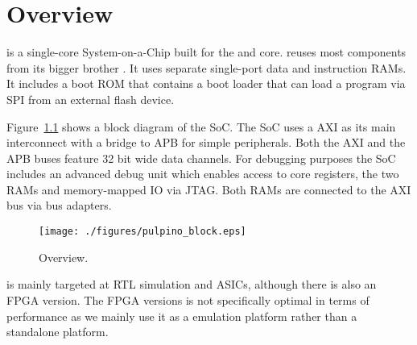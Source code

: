 \chapter{Overview}

\pulpino is a single-core System-on-a-Chip built for the \riscv \rvcore and \zerocore core.
\pulpino reuses most components from its bigger brother \pulp.
It uses separate single-port data and instruction RAMs. It includes a boot ROM
that contains a boot loader that can load a program via SPI from an external
flash device.

Figure~\ref{fig:pulpino_overview} shows a block diagram of the SoC.
The SoC uses a AXI as its main interconnect with a bridge to APB for simple
peripherals. Both the AXI and the APB buses feature 32 bit wide data channels.
For debugging purposes the SoC includes an advanced debug unit
which enables access to core registers, the two RAMs and memory-mapped IO via JTAG.
Both RAMs are connected to the AXI bus via bus adapters.

\begin{figure}[H]
  \centering
  \texttt{[image: ./figures/pulpino\_block.eps]}
  \caption{\pulpino Overview.}
  \label{fig:pulpino_overview}
\end{figure}


\pulpino is mainly targeted at RTL simulation and ASICs, although there is also
an FPGA version. The FPGA versions is not specifically optimal in terms of
performance as we mainly use it as a emulation platform rather than a standalone
platform.
